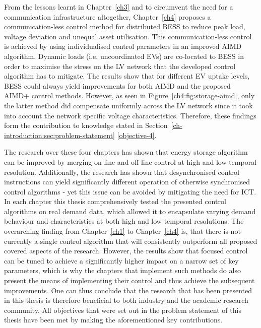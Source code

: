 From the lessons learnt in Chapter~\ref{ch3} and to circumvent the need for a communication infrastructure altogether, Chapter~\ref{ch4} proposes a communication-less control method for distributed BESS to reduce peak load, voltage deviation and unequal asset utilisation.
This communication-less control is achieved by using individualised control parameters in an improved AIMD algorithm.
Dynamic loads (i.e. uncoordinated EVs) are co-located to BESS in order to maximise the stress on the LV network that the developed control algorithm has to mitigate.
The results show that for different EV uptake levels, BESS could always yield improvements for both AIMD and the proposed AIMD+ control methods.
However, as seen in Figure~\ref{ch4:fig:storage-aimd}, only the latter method did compensate uniformly across the LV network since it took into account the network specific voltage characteristics.
Therefore, these findings form the contribution to knowledge stated in Section~\ref{ch-introduction:sec:problem-statement} \ref{objective-4}.

The research over these four chapters has shown that energy storage algorithm can be improved by merging on-line and off-line control at high and low temporal resolution.
Additionally, the research has shown that desynchronised control instructions can yield significantly different operation of otherwise synchronised control algorithms - yet this issue can be avoided by mitigating the need for ICT.
In each chapter this thesis comprehensively tested the presented control algorithms on real demand data, which allowed it to encapsulate varying demand behaviour and characteristics at both high and low temporal resolutions.
The overarching finding from Chapter~\ref{ch1} to Chapter~\ref{ch4} is, that there is not currently a single control algorithm that will consistently outperform all proposed covered aspects of the research.
However, the results show that focused control can be tuned to achieve a significantly higher impact on a narrow set of key parameters, which is why the chapters that implement such methods do also present the means of implementing their control and thus achieve the subsequent improvements.
One can thus conclude that the research that has been presented in this thesis is therefore beneficial to both industry and the academic research community.
All objectives that were set out in the problem statement of this thesis have been met by making the aforementioned key contributions.

